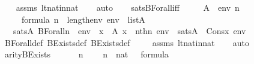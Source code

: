 \begin{isabellebody}
\ \ \isamarkupfalse%
\ assms\ lt{\isacharunderscore}{\kern0pt}nat{\isacharunderscore}{\kern0pt}in{\isacharunderscore}{\kern0pt}nat\isanewline
\ \ \isamarkupfalse%
\ auto%
\endisatagproof
{\isafoldproof}%
%
\isadelimproof
\isanewline
%
\endisadelimproof
\ \ \isanewline
{}\isamarkupfalse%
\ sats{\isacharunderscore}{\kern0pt}BForall{\isacharunderscore}{\kern0pt}iff\ {\isacharcolon}{\kern0pt}\ \isanewline
\ \ \ A\ {\isasymphi}\ env\ n\ \isanewline
\ \ \ {\isachardoublequoteopen}{\isasymphi}\ {\isasymin}\ formula{\isachardoublequoteclose}\ {\isachardoublequoteopen}n\ {\isacharless}{\kern0pt}\ length{\isacharparenleft}{\kern0pt}env{\isacharparenright}{\kern0pt}{\isachardoublequoteclose}\ {\isachardoublequoteopen}env\ {\isasymin}\ list{\isacharparenleft}{\kern0pt}A{\isacharparenright}{\kern0pt}{\isachardoublequoteclose}\ \isanewline
\ \ \ {\isachardoublequoteopen}sats{\isacharparenleft}{\kern0pt}A{\isacharcomma}{\kern0pt}\ BForall{\isacharparenleft}{\kern0pt}n{\isacharcomma}{\kern0pt}\ {\isasymphi}{\isacharparenright}{\kern0pt}{\isacharcomma}{\kern0pt}\ env{\isacharparenright}{\kern0pt}\ {\isasymlongleftrightarrow}\ {\isacharparenleft}{\kern0pt}{\isasymforall}x\ {\isasymin}\ A{\isachardot}{\kern0pt}\ x\ {\isasymin}\ nth{\isacharparenleft}{\kern0pt}n{\isacharcomma}{\kern0pt}\ env{\isacharparenright}{\kern0pt}\ {\isasymlongrightarrow}\ sats{\isacharparenleft}{\kern0pt}A{\isacharcomma}{\kern0pt}\ {\isasymphi}{\isacharcomma}{\kern0pt}\ Cons{\isacharparenleft}{\kern0pt}x{\isacharcomma}{\kern0pt}\ env{\isacharparenright}{\kern0pt}{\isacharparenright}{\kern0pt}{\isacharparenright}{\kern0pt}{\isachardoublequoteclose}\ \isanewline
%
\isadelimproof
\ \ %
\endisadelimproof
%
\isatagproof
{}\isamarkupfalse%
\ BForall{\isacharunderscore}{\kern0pt}def\ BExists{\isacharunderscore}{\kern0pt}def\ BExists{\isacharprime}{\kern0pt}{\isacharunderscore}{\kern0pt}def\ \isanewline
\ \ \isamarkupfalse%
\ assms\ lt{\isacharunderscore}{\kern0pt}nat{\isacharunderscore}{\kern0pt}in{\isacharunderscore}{\kern0pt}nat\isanewline
\ \ \isamarkupfalse%
\ auto%
\endisatagproof
{\isafoldproof}%
%
\isadelimproof
\isanewline
%
\endisadelimproof
\isanewline
{}\isamarkupfalse%
\ arity{\isacharunderscore}{\kern0pt}BExists\ {\isacharcolon}{\kern0pt}\ \isanewline
\ \ \ {\isasymphi}\ n\ \isanewline
\ \ \ {\isachardoublequoteopen}n\ {\isasymin}\ nat{\isachardoublequoteclose}\ {\isachardoublequoteopen}{\isasymphi}\ {\isasymin}\ formula{\isachardoublequoteclose}\ \isanewline

\end{isabellebody}
